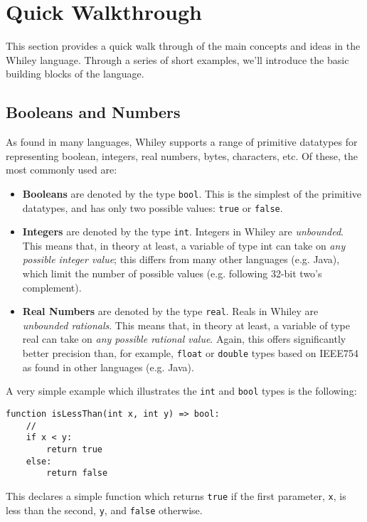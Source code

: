 \newpage
\section{Quick Walkthrough}
This section provides a quick walk through of the main concepts and
ideas in the Whiley language.  Through a series of short examples,
we'll introduce the basic building blocks of the language.

\subsection{Booleans and Numbers}

As found in many languages, Whiley supports a range of primitive
datatypes for representing boolean, integers, real numbers, bytes,
characters, etc.  Of these, the most commonly used are:

\begin{itemize}
\item {\bf Booleans} are denoted by the type \lstinline{bool}.  This is the
  simplest of the primitive datatypes, and has only two possible
  values: \lstinline{true} or \lstinline{false}.
\item {\bf Integers} are denoted by the type \lstinline{int}.  Integers in
  Whiley are {\em unbounded}. This means that, in theory at least, a
  variable of type int can take on {\em any possible integer value};
  this differs from many other languages (e.g. Java), which limit the
  number of possible values (e.g. following 32-bit two's complement).
\item {\bf Real Numbers} are denoted by the type
  \lstinline{real}. Reals in Whiley are {\em unbounded
    rationals}. This means that, in theory at least, a variable of
  type real can take on {\em any possible rational value}. Again, this
  offers significantly better precision than, for example,
  \lstinline{float} or \lstinline{double} types based on IEEE754 as
  found in other languages (e.g. Java).
\end{itemize}


\noindent A very simple example which illustrates the \lstinline{int} and
\lstinline{bool} types is the following:
\begin{lstlisting}
function isLessThan(int x, int y) => bool:
    //
    if x < y:
        return true
    else:
        return false
\end{lstlisting}
This declares a simple function which returns \lstinline{true} if the
first parameter, \lstinline{x}, is less than the second,
\lstinline{y}, and \lstinline{false} otherwise.

